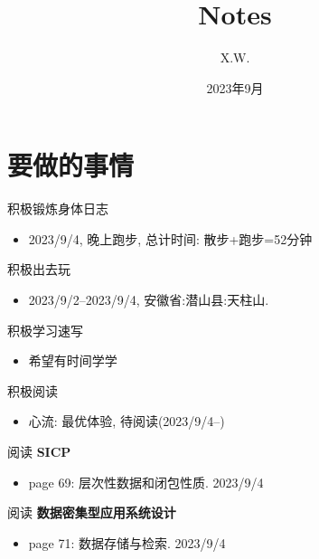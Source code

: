 \documentclass[a4,10pt]{ctexart}
\begin{document}
\title{Notes}
\author{X.W.}
\date{2023年9月}
\maketitle
\tableofcontents
\newpage
{}
\newpage


\section{要做的事情}

\begin{yd}{积极锻炼身体日志}{}
	\begin{itemize}
		\item 2023/9/4, 晚上跑步, 总计时间: 散步+跑步=52分钟
	\end{itemize}
\end{yd}

\begin{yd}{积极出去玩}{}
	\begin{itemize}
		\item 2023/9/2--2023/9/4, 安徽省:潜山县:天柱山.
	\end{itemize}
\end{yd}

\begin{yd}{积极学习速写}{}
	\begin{itemize}
		\item 希望有时间学学
	\end{itemize}
\end{yd}

\begin{yd}{积极阅读}{}
	\begin{itemize}
		\item 心流: 最优体验, 待阅读(2023/9/4--)
	\end{itemize}
\end{yd}


\begin{yd}{阅读 \textbf{SICP}}{}
	\begin{itemize}
		\item page 69: 层次性数据和闭包性质. 2023/9/4
	\end{itemize}
\end{yd}

\begin{yd}{阅读 \textbf{数据密集型应用系统设计}}{}
	\begin{itemize}
		\item page 71: 数据存储与检索. 2023/9/4
	\end{itemize}
\end{yd}
\end{document}
